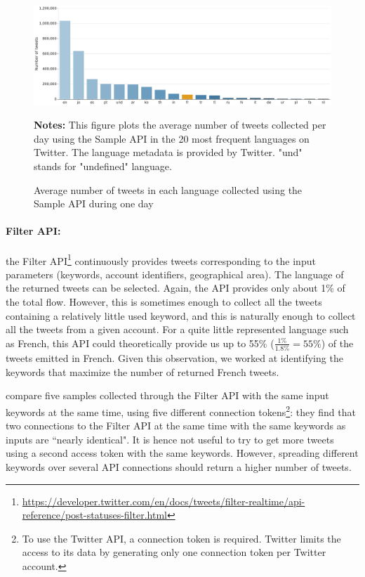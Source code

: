 \begin{figure}
\begin{center}
\includegraphics[width=1\textwidth]{figures/HistogramLanguages.pdf}
\end{center}
{\scriptsize \textbf{Notes:} This figure plots the average number of tweets collected  per day using the Sample API in the 20 most frequent languages on Twitter. The language metadata is provided by Twitter. "und" stands for "undefined" language.}
\caption{Average number of tweets in each language collected using the Sample API during one day}
\label{Figure:HistogramLanguages}
\end{figure}


\paragraph{Filter API:}

the Filter API\footnote{\url{https://developer.twitter.com/en/docs/tweets/filter-realtime/api-reference/post-statuses-filter.html}} continuously provides tweets corresponding to the input parameters (keywords, account identifiers, geographical area). The language of the returned tweets can be selected. Again, the API provides only about 1\% of the total flow. However, this is sometimes enough to collect all the tweets containing a relatively little used keyword, and this is naturally enough to collect all the tweets from a given account. For a quite little represented language such as French, this API could theoretically provide us up to 55\% ($\frac{1\%}{1.8\%} = 55\%$) of the tweets emitted in French. Given this observation, we worked at identifying the keywords that maximize the number of returned French tweets.


\citet{joseph_two_2014} compare five samples collected through the Filter API with the same input keywords at the same time, using five different connection tokens\footnote{To use the Twitter API, a connection token is required. Twitter limits the access to its data by generating only one connection token per Twitter account.}: they find that two connections to the Filter API at the same time with the same keywords as inputs are ``nearly identical". It is hence not useful to try to get more tweets using a second access token with the same keywords. However, spreading different keywords over several API connections should return a higher number of tweets.

